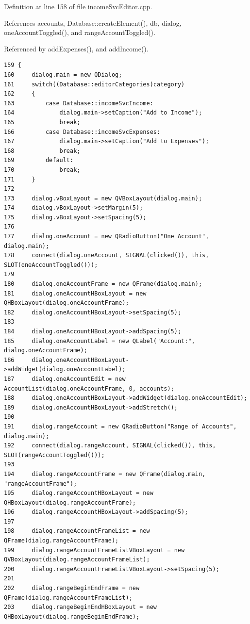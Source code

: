 Definition at line 158 of file income\-Svc\-Editor.cpp.

References accounts, Database::create\-Element(), db, dialog, one\-Account\-Toggled(), and range\-Account\-Toggled().

Referenced by add\-Expenses(), and add\-Income().

\footnotesize\begin{verbatim}159 {
160     dialog.main = new QDialog;
161     switch((Database::editorCategories)category)
162     {
163         case Database::incomeSvcIncome:
164             dialog.main->setCaption("Add to Income");
165             break;
166         case Database::incomeSvcExpenses:
167             dialog.main->setCaption("Add to Expenses");
168             break;
169         default:
170             break;
171     }
172     
173     dialog.vBoxLayout = new QVBoxLayout(dialog.main);
174     dialog.vBoxLayout->setMargin(5);
175     dialog.vBoxLayout->setSpacing(5);
176     
177     dialog.oneAccount = new QRadioButton("One Account", dialog.main);
178     connect(dialog.oneAccount, SIGNAL(clicked()), this, SLOT(oneAccountToggled()));
179         
180     dialog.oneAccountFrame = new QFrame(dialog.main);
181     dialog.oneAccountHBoxLayout = new QHBoxLayout(dialog.oneAccountFrame);
182     dialog.oneAccountHBoxLayout->setSpacing(5);
183     
184     dialog.oneAccountHBoxLayout->addSpacing(5);
185     dialog.oneAccountLabel = new QLabel("Account:", dialog.oneAccountFrame);
186     dialog.oneAccountHBoxLayout->addWidget(dialog.oneAccountLabel);
187     dialog.oneAccountEdit = new AccountList(dialog.oneAccountFrame, 0, accounts);
188     dialog.oneAccountHBoxLayout->addWidget(dialog.oneAccountEdit);
189     dialog.oneAccountHBoxLayout->addStretch();
190        
191     dialog.rangeAccount = new QRadioButton("Range of Accounts", dialog.main);
192     connect(dialog.rangeAccount, SIGNAL(clicked()), this, SLOT(rangeAccountToggled()));
193        
194     dialog.rangeAccountFrame = new QFrame(dialog.main, "rangeAccountFrame");
195     dialog.rangeAccountHBoxLayout = new QHBoxLayout(dialog.rangeAccountFrame);
196     dialog.rangeAccountHBoxLayout->addSpacing(5);
197     
198     dialog.rangeAccountFrameList = new QFrame(dialog.rangeAccountFrame);
199     dialog.rangeAccountFrameListVBoxLayout = new QVBoxLayout(dialog.rangeAccountFrameList);
200     dialog.rangeAccountFrameListVBoxLayout->setSpacing(5);
201     
202     dialog.rangeBeginEndFrame = new QFrame(dialog.rangeAccountFrameList);
203     dialog.rangeBeginEndHBoxLayout = new QHBoxLayout(dialog.rangeBeginEndFrame);

\end{verbatim}
